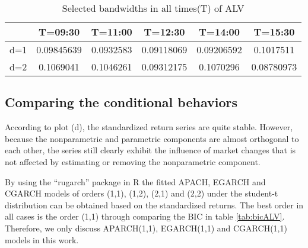 \begin{table}[!h]
 \small
  \centering
  \vspace{2ex} 
\begin{tabular}{c|c|c|c|c|c}
\toprule
    &T=09:30&T=11:00&T=12:30&T=14:00&T=15:30 \\
\midrule
\hline
d=1	&0.09845639	& 0.0932583		&0.09118069	& 0.09206592  &	0.1017511\\
d=2	&0.1069041	& 0.1046261		&0.09312175	& 0.1070296	  &   0.08780973\\
\bottomrule

\end{tabular}
  \caption{Selected bandwidths in all times(T) of ALV}
  \label{tab:bandwidthALV}
\end{table}




\subsection{Comparing the conditional behaviors}

According to plot (d), the standardized return series are quite stable. However, because the nonparametric and parametric components are almost orthogonal to each other, the series still clearly exhibit the influence of market changes that is not affected by estimating or removing the nonparametric component.

By using the ``rugarch'' package in R the fitted APACH, EGARCH and CGARCH models of orders (1,1), (1,2), (2,1) and (2,2) under the student-t distribution can be obtained based on the standardized returns. The best order in all cases is the order (1,1) through comparing the BIC in table \ref{tab:bicALV}. Therefore, we only discuss APARCH(1,1), EGARCH(1,1) and CGARCH(1,1) models in this work.




